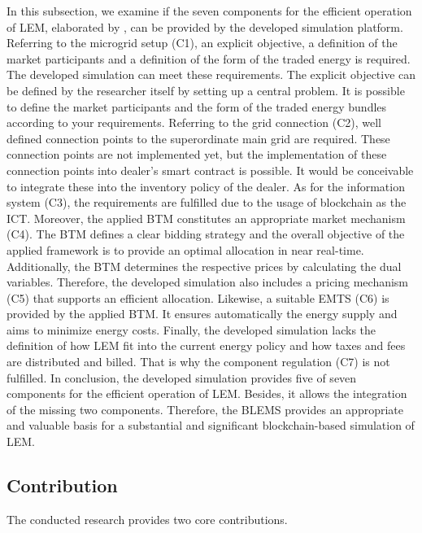 In this subsection, we examine if the seven components for the efficient operation of LEM,
elaborated by , can be 
provided by the developed simulation platform.
Referring to the microgrid setup (C1), an explicit objective, a definition of the market participants and a definition of the form of the traded energy is required. The developed simulation can meet these requirements. The explicit objective can be defined by the researcher itself by setting up a central problem. It is possible to define the market participants and the form of the traded energy bundles
according to your requirements.
Referring to the grid connection (C2), well defined connection points to the superordinate main grid are required.
These connection points are not implemented yet, but the implementation of these connection points 
into dealer's smart contract is possible.
It would be conceivable to integrate these into the inventory policy of the dealer.
As for the information system (C3), the requirements are fulfilled due to the usage of blockchain as the ICT.
Moreover, the applied BTM constitutes an appropriate market mechanism (C4). The BTM defines a clear bidding strategy and the 
overall objective of the applied framework is to provide an optimal allocation in near real-time. 
Additionally, the BTM determines the respective prices by calculating the dual variables.
Therefore, the developed simulation also includes a pricing mechanism (C5) that supports an efficient allocation.
Likewise, a suitable EMTS (C6) is provided by the applied BTM. 
It ensures automatically the energy supply and aims to minimize energy costs.
Finally, the developed simulation lacks the definition of how LEM fit into the current energy policy and how taxes and fees are distributed and billed. 
That is why the component regulation (C7) is not fulfilled. 
In conclusion, the developed simulation provides five of seven components for the efficient operation of LEM. 
Besides, it allows the integration of the missing two components.
Therefore, the BLEMS provides an appropriate and valuable basis for a substantial and significant blockchain-based simulation of LEM. 

\subsection{Contribution}
The conducted research provides two core contributions.

